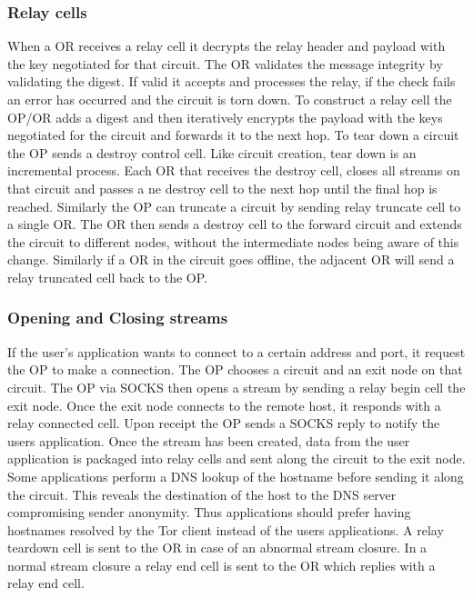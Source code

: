 \documentclass{llncs}
\begin{document}
\subsubsection{Relay cells}
When a OR receives a relay cell it decrypts the relay header and payload with the key negotiated for that circuit. The OR validates the message integrity by validating the digest. If valid it accepts and processes the relay, if the check fails an error has occurred and the circuit is torn down.
To construct a relay cell the OP/OR adds a digest and then iteratively encrypts the payload with the keys negotiated for the circuit and forwards it to the next hop.
To tear down a circuit the OP sends a destroy control cell. Like circuit creation, tear down is an incremental process. Each OR that receives the destroy cell, closes all streams on that circuit and passes a ne destroy cell to the next hop until the final hop is reached.
Similarly the OP can truncate a circuit by sending relay truncate cell to a single OR. The OR then sends a destroy cell to the forward circuit and extends the circuit to different nodes, without the intermediate nodes being aware of this change. Similarly if a OR in the circuit goes offline, the adjacent OR will send a relay truncated cell back to the OP. 

\subsubsection{Opening and Closing streams}
If the user's application wants to connect to a certain address and port, it request the OP to make a connection. The OP chooses a circuit and an exit node on that circuit. The OP via SOCKS then opens a stream by sending a relay begin cell the exit node. Once the exit node connects to the remote host, it responds with a relay connected cell. Upon receipt the OP sends a SOCKS reply to notify the users application. Once the stream has been created, data from the user application is packaged into relay cells and sent along the circuit to the exit node.
Some applications perform a DNS lookup of the hostname before sending it along the circuit. This reveals the destination of the host to the DNS server compromising sender anonymity. Thus applications should prefer having hostnames resolved by the Tor client instead of the users applications.
A relay teardown cell is sent to the OR in case of an abnormal stream closure. In a normal stream closure a relay end cell is sent to the OR which replies with a relay end cell.
\end{document}
